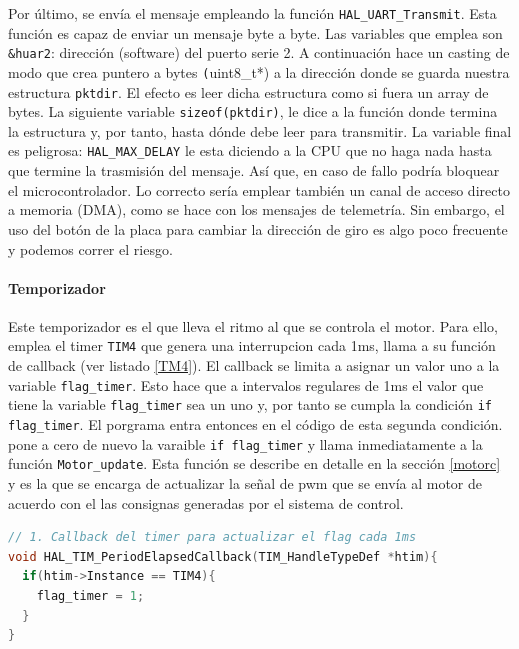 Por último, se envía el mensaje empleando la función \texttt{HAL\_UART\_Transmit}. Esta función es capaz de enviar un mensaje byte a byte. Las variables que emplea son \texttt{\&huar2}: dirección (software) del puerto serie 2. A continuación hace un casting de modo que crea puntero a bytes \texttt(uint8\_t*) a la dirección donde se guarda nuestra estructura \texttt{pktdir}. El efecto es leer dicha estructura como si fuera un array de bytes. La siguiente variable \texttt{sizeof(pktdir)}, le dice a la función donde termina la estructura y, por tanto, hasta dónde debe leer para transmitir. La variable final es peligrosa: \texttt{HAL\_MAX\_DELAY} le esta diciendo a la CPU que no haga nada hasta que termine la trasmisión del mensaje. Así que, en caso de fallo podría bloquear el microcontrolador. Lo correcto sería emplear también un canal de acceso directo a memoria (DMA), como se hace con los mensajes de telemetría. Sin embargo, el uso del botón de la placa para cambiar la dirección de giro es algo poco frecuente y podemos correr el riesgo.

\paragraph{Temporizador}
Este temporizador es el que lleva el ritmo al que se controla el motor. Para ello, emplea el timer \texttt{TIM4} que genera una interrupcion cada 1ms, llama a su función de callback (ver listado \ref{TM4}). El callback se limita a asignar un valor uno a la variable \texttt{flag\_timer}. Esto hace que a intervalos regulares de 1ms el valor que tiene la variable \texttt{flag\_timer} sea un uno y, por tanto se cumpla la condición \texttt{if flag\_timer}. El porgrama entra entonces en el código de esta segunda condición. pone a cero de nuevo la varaible \texttt{if flag\_timer} y llama inmediatamente a la función \texttt{Motor\_update}. Esta función se describe en detalle en la sección \ref{motorc} y es la que se encarga de actualizar la señal de pwm que se envía al motor de acuerdo con el las consignas generadas por el sistema de control.

\begin{lstlisting}[language=C, caption={funci\'on callback empleada por el timer TM4}, label=TM4 ] 
// 1. Callback del timer para actualizar el flag cada 1ms
void HAL_TIM_PeriodElapsedCallback(TIM_HandleTypeDef *htim){
  if(htim->Instance == TIM4){
    flag_timer = 1;
  }
}

\end{lstlisting}

